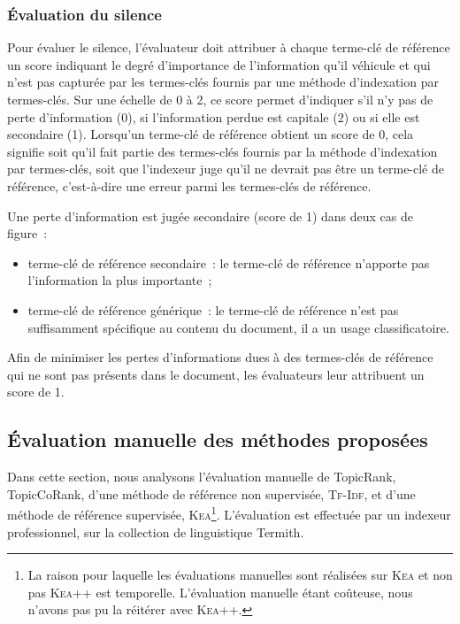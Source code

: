       \subsubsection{Évaluation du silence}
      \label{subsubsec:main-automatic_evaluation_of_keyphrase_annotation-methodology-evaluation_protocol-silence}
        Pour évaluer le silence, l'évaluateur doit attribuer à chaque terme-clé
        de référence un score indiquant le degré d'importance de l'information
        qu'il véhicule et qui n'est pas capturée par les termes-clés fournis par
        une méthode d'indexation par termes-clés. Sur une échelle de 0 à 2, ce
        score permet d'indiquer s'il n'y pas de perte d'information (0), si
        l'information perdue est capitale (2) ou si elle est secondaire (1).
        Lorsqu'un terme-clé de référence obtient un score de 0, cela signifie
        soit qu'il fait partie des termes-clés fournis par la méthode
        d'indexation par termes-clés, soit que l'indexeur juge qu'il ne devrait
        pas être un terme-clé de référence, c'est-à-dire une erreur parmi les
        termes-clés de référence.

        Une perte d'information est jugée secondaire (score de 1) dans deux
        cas de figure~:
        \begin{itemize}
          \item{terme-clé de référence secondaire~: le terme-clé de référence
                n'apporte pas l'information la plus importante~;}
          \item{terme-clé de référence générique~: le terme-clé de référence
                n'est pas suffisamment spécifique au contenu du document, il a
                un usage classificatoire.}
        \end{itemize}
        Afin de minimiser les pertes d'informations dues à des termes-clés de
        référence qui ne sont pas présents dans le document, les évaluateurs
        leur attribuent un score de 1.

    \subsection{Évaluation manuelle des méthodes proposées}
    \label{subsec:main-domain_specific_keyphrase_annotation-manual_evaluation-analysis}
      Dans cette section, nous analysons l'évaluation manuelle de TopicRank,
      TopicCoRank, d'une méthode de référence non supervisée, \textsc{Tf-Idf},
      et d'une méthode de référence supervisée, \textsc{Kea}\footnote{La raison
      pour laquelle les évaluations
      manuelles sont réalisées sur \textsc{Kea} et non pas \textsc{Kea++} est
      temporelle. L'évaluation manuelle étant coûteuse, nous n'avons pas pu
      la réitérer avec \textsc{Kea++}.}. L'évaluation est
      effectuée par un indexeur professionnel, sur la collection de linguistique
      Termith.


